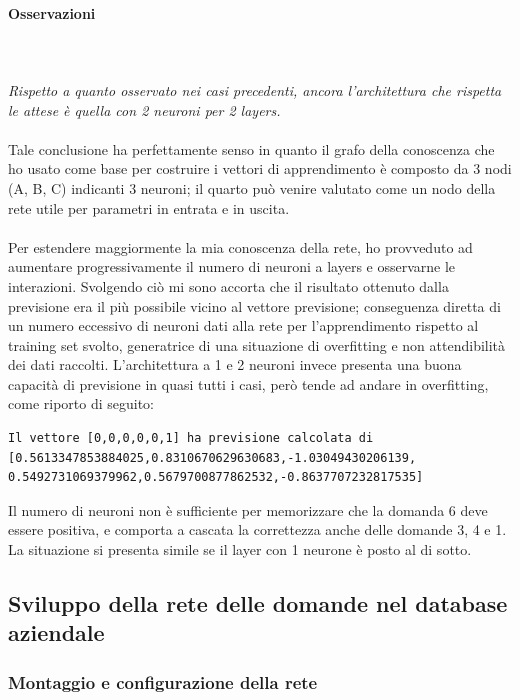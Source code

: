 \paragraph{Osservazioni}\mbox{}
\label{Osservazioni su rete a 4 neuroni per 1 layer}
\\\\
\noindent
\textit{Rispetto a quanto osservato nei casi precedenti, ancora l'architettura  che rispetta le attese \`e quella con 2 neuroni per 2 layers.}
\\\\
\noindent
Tale conclusione ha perfettamente senso in quanto il grafo della conoscenza che ho usato come base per costruire i vettori di apprendimento \`e composto da 3 nodi (A, B, C) indicanti 3 neuroni; il quarto pu\`o venire valutato come un nodo della rete utile per parametri in entrata e in uscita.
\\\\
Per estendere maggiormente la mia conoscenza della rete, ho provveduto ad aumentare progressivamente il numero di neuroni a layers e osservarne le interazioni. Svolgendo ci\`o mi sono accorta che il risultato ottenuto dalla previsione era il pi\`u possibile vicino al vettore previsione; conseguenza diretta di un numero eccessivo di neuroni dati alla rete per l'apprendimento rispetto al training set svolto, generatrice di una situazione di overfitting e non attendibilit\`a dei dati raccolti.
L'architettura a 1 e 2 neuroni invece presenta una buona capacit\`a di previsione in quasi tutti i casi, per\`o tende ad andare in overfitting, come riporto di seguito:
\begin{verbatim}
Il vettore [0,0,0,0,0,1] ha previsione calcolata di
[0.5613347853884025,0.8310670629630683,-1.03049430206139,
0.5492731069379962,0.5679700877862532,-0.8637707232817535]
\end{verbatim}
Il numero di neuroni non \`e sufficiente per memorizzare che la domanda 6 deve essere positiva, e comporta a cascata la correttezza anche delle domande 3, 4 e 1. La situazione si presenta simile se il layer con 1 neurone \`e posto al di sotto.


\subsection{Sviluppo della rete delle domande nel database aziendale}
\label{Sviluppo della rete del database}

\subsubsection{Montaggio e configurazione della rete}
\label{Montaggio e configurazione della rete}

